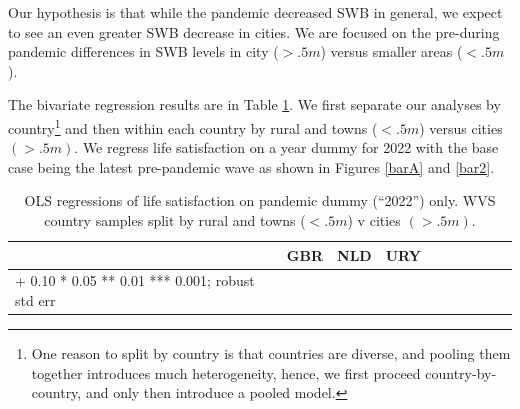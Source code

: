 \documentclass[10pt, letterpaper]{article}
\begin{document}
\begin{spacing}{1.4}
Our hypothesis is that while the pandemic decreased SWB in general, we expect to
see an even greater SWB decrease in cities. We are focused on the pre-during
pandemic differences in SWB levels in city ($>.5m$) versus smaller areas ($<.5m$). 

The bivariate regression results are in Table \ref{a}. We first separate our
analyses by country\footnote{One reason to split by country is that countries
  are diverse, and pooling them together introduces much heterogeneity, hence,
  we first proceed country-by-country, and only then introduce a pooled model.} and then within each country by rural and towns ($<.5m$) versus cities $(>.5m)$. We regress life satisfaction on a year dummy for 2022 with the base case being the latest pre-pandemic wave as shown in Figures \ref{barA} and \ref{bar2}. 



\begin{spacing}{.9} \begin{table}[H]\centering   \begin{scriptsize} \begin{tabular}{p{1.8in}p{.5in}p{.5in}|p{.5in}p{.5in}|p{.5in}p{.5in}|p{.5in}p{.5in}p{.5in}p{.5
                                                                      in}p{.5in}p{.5
                                                                      in}}\hline&\multicolumn{2}{c}{GBR}&\multicolumn{2}{c}{NLD}&\multicolumn{2}{c}{URY}\\
                                                                      
                                                                      \hline +
                                                                      0.10 *
                                                                      0.05 **
                                                                      0.01 ***
                                                                      0.001;
                                                                      robust std
                                                                      err \end{tabular}\end{scriptsize}\caption{\label{a}OLS
                                                                    regressions
                                                                    of life
                                                                    satisfaction
                                                                    on pandemic
                                                                    dummy
                                                                    (``2022'') only. WVS
                                                                   country
                                                                   samples split
                                                                 by rural and towns ($<.5m$) v cities $(>.5m).$}\end{table} \end{spacing}



\end{spacing}
\end{document}
